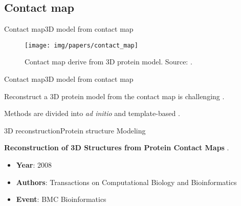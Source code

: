 \documentclass[10pt]{beamer}
\newcommand{\1}{
        	\setbeamertemplate{background}{
        		\texttt{[image: img/1]}
        		\tikz[overlay] \fill[fill opacity=0.75,fill=white] (0,0) rectangle (-\paperwidth,\paperheight);
        	}
}
\begin{document}
\subsection{Contact map}

\begin{frame}{Contact map}{3D model from contact map}
	\begin{figure}
		\centering
		\texttt{[image: img/papers/contact\_map]}
		\caption{Contact map derive from 3D protein model. Source: \cite{emerson2017protein}.}
	\end{figure}
\end{frame}

\begin{frame}{Contact map}{3D model from contact map}
	\begin{block}{}
		Reconstruct a 3D protein model from the contact map is challenging \cite{emerson2017protein}.
	\end{block}

	\begin{block}{}
		Methods are divided into \textit{ad initio} and template-based \cite{emerson2017protein}.
	\end{block}
\end{frame}


\begin{frame}{3D reconstruction}{Protein structure Modeling}
	
	\begin{block}{}
		\centering
		\textbf{Reconstruction of 3D Structures from Protein Contact Maps} \cite{vassura2008reconstruction}.
	\end{block}
	
	\begin{itemize}
		\item \textbf{Year}: 2008
		\item \textbf{Authors}: Transactions on Computational Biology and Bioinformatics
		\item \textbf{Event}: BMC Bioinformatics
	\end{itemize}
\end{frame}
\end{document}

